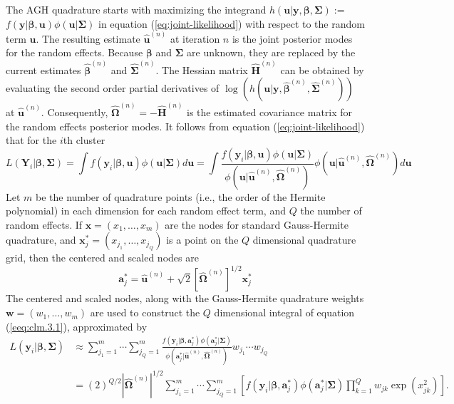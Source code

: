 The AGH quadrature starts with maximizing the integrand $h(\bm u|\bm y, \bm \beta, \bm \Sigma) :=$ 
\\$f(\bm y|\bm \beta, \bm u)\phi(\bm u|\bm \Sigma)$ in equation (\ref{eq:joint-likelihood}) with
respect to the random term $\bm u$. The resulting estimate $\hat{\bm u}^{(n)}$ at iteration $n$ is
the joint posterior modes for the random effects. Because $\bm \beta$ and $\bm \Sigma$ are unknown,
they are replaced by the current estimates $\hat{\bm \beta}^{(n)}$ and $\hat{\bm \Sigma}^{(n)}$. The
Hessian matrix $\hat{\bm H}^{(n)}$ can be obtained by evaluating the second order partial
derivatives of $\log(h(\bm u|\bm y, \hat{\bm \beta}^{(n)}, \hat{\bm \Sigma}^{(n)}))$ at $\hat{\bm
	u}^{(n)}$. Consequently, $\hat{\bm \Omega}^{(n)} =-\hat{\bm H}^{(n)} $ is the estimated covariance
matrix for the random effects posterior modes. It follows from equation (\ref{eq:joint-likelihood})
that for the $i$th cluster 
\begin{equation}\label{eeq:clm.3.1}
	L( \bm Y_i|\bm \beta, \bm \Sigma) = \int f(\bm y_i|\bm \beta, \bm u )\phi(\bm u|\bm\Sigma)d\bm u =
	\int \frac{f(\bm y_i|\bm \beta, \bm u )\phi(\bm u|\bm\Sigma)}{\phi(\bm u|\hat{\bm
			u}^{(n)},\hat{\bm \Omega}^{(n)} )}\phi(\bm u|\hat{\bm u}^{(n)},\hat{\bm \Omega}^{(n)} )d\bm u
\end{equation}
Let $m$ be the number of quadrature points (i.e., the order of the Hermite
polynomial) in each dimension for each random effect term, and $Q$ the number of random
effects. If $\bm x = (x_1, \ldots, x_m)$ are the nodes for standard Gauss-Hermite quadrature, and
$\bm x^{\ast}_j=(x_{j_1}, \ldots, x_{j_Q}) $ is a point on the $Q$ dimensional quadrature grid, then
the centered and scaled nodes are 
\begin{equation}\label{1.3.2}
	\bm  a_j^{\ast} = \hat{\bm u}^{(n)} + \sqrt{2} [\hat{\bm \Omega}^{(n)} ]^{1/2}\bm x^{\ast}_j
\end{equation}
The centered and scaled nodes, along with the Gauss-Hermite quadrature weights $\bm w = (w_1,
\ldots, w_m)$ are used to construct the $Q$ dimensional integral of equation (\ref{eeq:clm.3.1}),
approximated by 
\begin{equation}\label{eq:gh-approx}
	\begin{aligned}
		L(\bm y_i|\bm\beta, \bm \Sigma) &\approx\sum_{j_1=1}^m\cdots \sum_{j_Q=1}^m\frac{f(\bm y_i|\bm
			\beta, \bm  a_j^{\ast})\phi(\bm  a_j^{\ast}|\bm\Sigma)}{\phi(\bm  a_j^{\ast}|\hat{\bm
				u}^{(n)},\hat{\bm \Omega}^{(n)} )}w_{j_1}\cdots w_{j_Q}\\
		& = (2)^{Q/2}|\hat{\bm \Omega}^{(n)}|^{1/2}\sum_{j_1=1}^m\cdots \sum_{j_Q=1}^m\left[ f(\bm y_i|\bm
		\beta, \bm  a_j^{\ast} )\phi(\bm  a_j^{\ast}|\bm\Sigma) 
		\prod_{k=1}^Qw_{jk}\exp(x_{jk}^2)\right].
	\end{aligned}
\end{equation}
